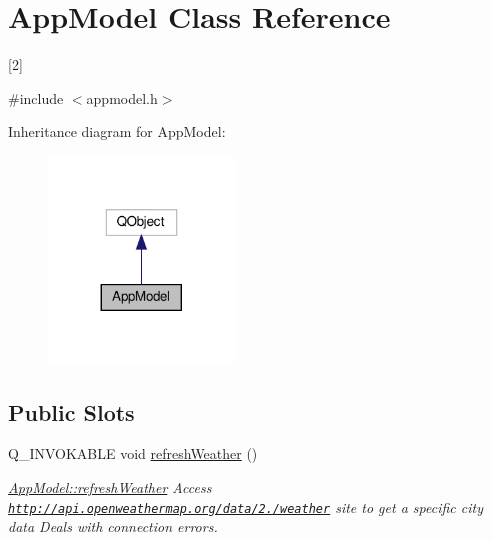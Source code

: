 \hypertarget{class_app_model}{}\section{App\+Model Class Reference}
\label{class_app_model}


\mbox{[}2\mbox{]}  




{\ttfamily \#include $<$appmodel.\+h$>$}



Inheritance diagram for App\+Model\+:\nopagebreak
\begin{figure}[H]
\begin{center}
\leavevmode
\includegraphics[width=140pt]{class_app_model__inherit__graph}
\end{center}
\end{figure}
\subsection*{Public Slots}
\begin{DoxyCompactItemize}
\item 
Q\+\_\+\+I\+N\+V\+O\+K\+A\+B\+LE void \hyperlink{class_app_model_a37e1da9d028779f7f0fc908e4c04fa76}{refresh\+Weather} ()
\begin{DoxyCompactList}\small\item\em \hyperlink{class_app_model_a37e1da9d028779f7f0fc908e4c04fa76}{App\+Model\+::refresh\+Weather} Access \href{http://api.openweathermap.org/data/2.5/weather}{\tt http\+://api.\+openweathermap.\+org/data/2./weather} site to get a specific city data Deals with connection errors. \end{DoxyCompactList}\end{DoxyCompactItemize}
